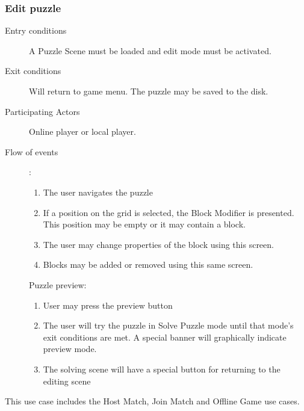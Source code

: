\documentclass[12pt]{article}
\begin{document}
    \subsubsection{Edit puzzle}
    \begin{description}
        \item[Entry conditions] A Puzzle Scene must be loaded and edit mode
            must be activated.
        \item[Exit conditions] Will return to game menu. The puzzle may be
            saved to the disk.
        \item[Participating Actors] Online player or local player.
        \item[Flow of events]:
            \begin{enumerate}
                \item The user navigates the puzzle
                \item If a position on the grid is selected, the Block Modifier
                    is presented. This position may be empty or it may
                    contain a block.
                \item The user may change properties of the block using this
                    screen.
                \item Blocks may be added or removed using this same screen.
            \end{enumerate}
            Puzzle preview:
            \begin{enumerate}
                \item User may press the preview button
                \item The user will try the puzzle in Solve Puzzle mode until
                    that mode's exit conditions are met.
                    A special banner will graphically indicate preview mode.
                \item The solving scene will have a special button for
                    returning to the editing scene
            \end{enumerate}
    \end{description}


    This use case includes the Host Match, Join Match and Offline Game
    use cases.
\end{document}
